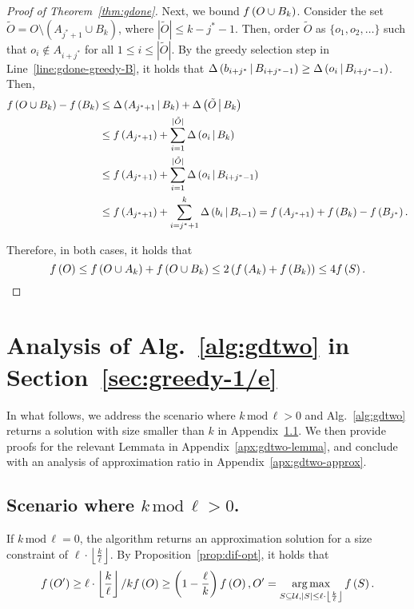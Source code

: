\begin{proof}[Proof of Theorem~\ref{thm:gdone}]
Next, we bound $f \left( O\cup B_k \right)$.
Consider the set $\tilde{O} = O\setminus \left(A_{j^*+1} \cup B_k\right)$,
where $|\tilde{O}| \le k-j^*-1$.
Then, order $\tilde{O}$ as $\{o_1, o_2, \ldots\}$
such that $o_i\not \in A_{i+j^*}$ for all $1\le i\le |\tilde{O}|$.
By the greedy selection step in Line~\ref{line:gdone-greedy-B},
it holds that $\Delta \left( b_{i+j^*} \, \middle| \, B_{i+j^*-1} \right)\ge \Delta \left( o_i \, \middle| \, B_{i+j^*-1} \right)$.
Then,
\begin{align*}
f \left( O\cup B_k \right) - f \left( B_k \right)&\le \Delta \left( A_{j^*+1} \, \middle| \, B_k \right) + \Delta \left( \tilde{O} \, \middle| \, B_k \right)\\
&\le f \left( A_{j^*+1} \right)+\sum\limits_{i=1}^{|\tilde{O}|} \Delta \left( o_i \, \middle| \, B_k \right)\\
&\le f \left( A_{j^*+1} \right)+\sum\limits_{i=1}^{|\tilde{O}|} \Delta \left( o_i \, \middle| \, B_{i+j^*-1} \right)\\
&\le f \left( A_{j^*+1} \right)+\sum\limits_{i=j^*+1}^{k} \Delta \left( b_i \, \middle| \, B_{i-1} \right) 
= f \left( A_{j^*+1} \right) + f \left( B_k \right)-f \left( B_{j^*} \right).
\end{align*}

Therefore, in both cases, it holds that
\[f \left( O \right)\le f \left( O\cup A_k \right)+f \left( O\cup B_k \right)\le 2\left(f \left( A_k \right)+f \left( B_k \right)\right)\le 4f \left( S \right).\]

\end{proof}

\section{Analysis of Alg.~\ref{alg:gdtwo} in Section~\ref{sec:greedy-1/e}}
\label{apx:greedy-1/e}
In what follows, we address the scenario where $k\, \text{mod}\,\ell > 0$
and Alg.~\ref{alg:gdtwo} returns a solution with size smaller than $k$
in Appendix~\ref{apx:gdtwo-k}.
We then provide proofs for the relevant Lemmata in Appendix~\ref{apx:gdtwo-lemma},
and conclude with an analysis of approximation ratio in Appendix~\ref{apx:gdtwo-approx}.
\subsection{Scenario where $k\, \text{mod}\,\ell > 0$.}\label{apx:gdtwo-k}
If $k\, \text{mod}\,\ell = 0$, 
the algorithm returns an approximation solution for a size constraint of 
$\ell\cdot\left\lfloor\frac{k}{\ell}\right\rfloor$.
By Proposition~\ref{prop:dif-opt}, it holds that 
\begin{equation}\label{inq:dif-opt}
f \left( O' \right)\ge \ell\cdot\left\lfloor\frac{k}{\ell}\right\rfloor / k f \left( O \right)
\ge \left(1-\frac{\ell}{k}\right)f \left( O \right),
O' = \operatorname*{arg\,max}\limits_{S\subseteq \mathcal U, |S|\le \ell\cdot\left\lfloor\frac{k}{\ell}\right\rfloor} f \left( S \right).
\end{equation}

